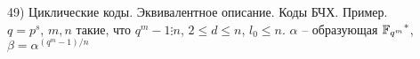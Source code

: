 49) Циклические коды. Эквивалентное описание. Коды БЧХ. Пример.\\
$q = p^s$, $m, n$ такие, что $q^m-1 \vdots n$, $2 \le d \le n$, $l_0 \le n$. $\alpha$ -- образующая ${\mathbb{F}_{q^m}}^*$, $\beta=\alpha^{(q^m-1)/n}$\\
